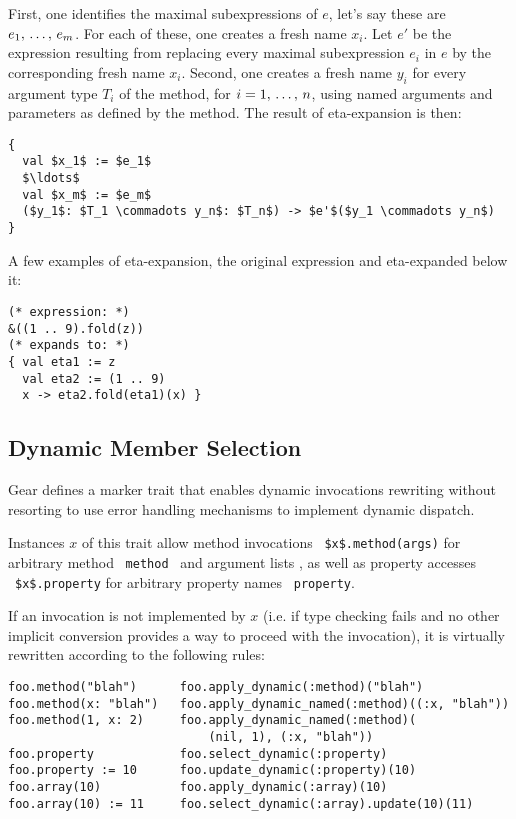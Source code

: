First, one identifies the maximal subexpressions of $e$, let's say these are $e_1 ,\, \ldots ,\, e_m$. For each of these, one creates a fresh name $x_i$. Let $e'$ be the expression resulting from replacing every maximal subexpression $e_i$ in $e$ by the corresponding fresh name $x_i$. Second, one creates a fresh name $y_i$ for every argument type $T_i$ of the method, for $i = 1 ,\, \ldots ,\, n$, using named arguments and parameters as defined by the method. The result of eta-expansion is then: 
\begin{lstlisting}
{
  val $x_1$ := $e_1$
  $\ldots$
  val $x_m$ := $e_m$
  ($y_1$: $T_1 \commadots y_n$: $T_n$) -> $e'$($y_1 \commadots y_n$)
}
\end{lstlisting}

\example A few examples of eta-expansion, the original expression and eta-expanded below it:
\begin{lstlisting}
(* expression: *)
&((1 .. 9).fold(z))
(* expands to: *)
{ val eta1 := z
  val eta2 := (1 .. 9)
  x -> eta2.fold(eta1)(x) }
\end{lstlisting}







\subsection{Dynamic Member Selection}
\label{sec:dynamic-member-selection}

Gear defines a marker trait  that enables dynamic invocations rewriting without resorting to use error handling mechanisms to implement dynamic dispatch. 

Instances $x$ of this trait allow method invocations ~\lstinline[deletekeywords={method}]!$x$.method(args)! for arbitrary method ~\lstinline[deletekeywords={method}]!method!~ and argument lists , as well as property accesses ~\lstinline[deletekeywords={property}]!$x$.property! for arbitrary property names ~\lstinline[deletekeywords={property}]!property!. 

If an invocation is not implemented by $x$ (i.e. if type checking fails and no other implicit conversion provides a way to proceed with the invocation), it is virtually rewritten according to the following rules:

\begin{lstlisting}[deletekeywords={property,method}]
foo.method("blah")      foo.apply_dynamic(:method)("blah")
foo.method(x: "blah")   foo.apply_dynamic_named(:method)((:x, "blah"))
foo.method(1, x: 2)     foo.apply_dynamic_named(:method)(
                            (nil, 1), (:x, "blah"))
foo.property            foo.select_dynamic(:property)
foo.property := 10      foo.update_dynamic(:property)(10)
foo.array(10)           foo.apply_dynamic(:array)(10)
foo.array(10) := 11     foo.select_dynamic(:array).update(10)(11)
\end{lstlisting}












